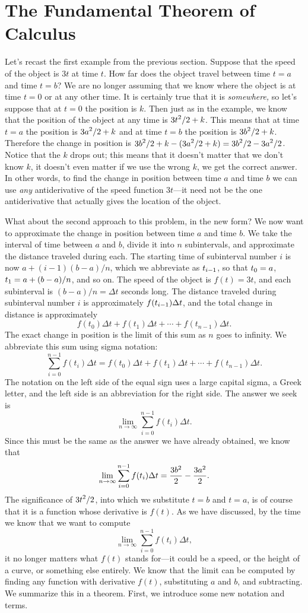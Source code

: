 \section{The Fundamental Theorem of Calculus}{}{}
\nobreak
Let's recast the first example from the previous section. Suppose that
the speed of the object is $3t$ at time $t$. How far does the object
travel between time $t=a$ and time $t=b$? We are no longer assuming
that we know where the object is at time $t=0$ or at any other
time. It is certainly true that it is {\it somewhere,} so let's
suppose that at $t=0$ the position is $k$. Then just as in the
example, we know that the position of the object at any time is 
$\displaystyle 3t^2/2+k$. This means that at time $t=a$ the position is 
$\displaystyle 3a^2/2+k$ and at time $t=b$ the position is $\displaystyle 3b^2/2+k$. Therefore the
change in position is $\displaystyle 3b^2/2+k-(3a^2/2+k)=3b^2/2-3a^2/2$. Notice that
the $k$ drops out; this means that it doesn't matter that we don't
know $k$, it doesn't even matter if we use the wrong $k$, we get the
correct answer. In other words, to find the change in position between
time $a$ and time $b$ we can use {\it any\/} antiderivative of the
speed function $3t$---it need not be the one antiderivative that
actually gives the location of the object.

What about the second approach to this problem, in the new form? We
now want to approximate the change in position between time $a$ and
time $b$. We take the interval of time between $a$ and $b$, divide it
into $n$ subintervals, and approximate the distance traveled during
each. The starting time of subinterval number $i$ is now 
$a+(i-1)(b-a)/n$, which we abbreviate as $\displaystyle t_{i-1}$, so that 
$\displaystyle t_0=a$, $\displaystyle t_1=a+(b-a)/n$, and so on. The speed of the object is
$f(t)=3t$, and each subinterval is $(b-a)/n=\Delta t$ seconds long.
The distance traveled during subinterval number
$i$ is approximately $\displaystyle f(t_{i-1})\Delta t$, and the total change in
distance is approximately
$$
  f(t_0)\Delta t+f(t_1)\Delta t+\cdots+f(t_{n-1})\Delta t.
$$
The exact change in position is the limit of this sum as $n$ goes to
infinity. We abbreviate this sum using {\dfont sigma notation}:
$$
  \sum_{i=0}^{n-1} f(t_i)\Delta t =
f(t_0)\Delta t+f(t_1)\Delta t+\cdots+f(t_{n-1})\Delta t.
$$
The notation on the left side of the equal sign uses a large capital
sigma, a Greek letter, and the left side is an abbreviation for the
right side. The answer we seek is
$$
  \lim_{n\to\infty}\sum_{i=0}^{n-1} f(t_i)\Delta t.
$$
Since this must be the same as the answer we have already obtained, we
know that 
$$
  \lim_{n\to\infty}\sum_{i=0}^{n-1} f(t_i)\Delta t={3b^2\over
  2}-{3a^2\over 2}.
$$
The significance of $\displaystyle 3t^2/2$, into which we substitute $t=b$ and
$t=a$, is of course that it is a function whose derivative is $f(t)$.
As we have discussed, by the time we know that we want to compute
$$
  \lim_{n\to\infty}\sum_{i=0}^{n-1} f(t_i)\Delta t,
$$
it no longer matters what $f(t)$ stands for---it could be a speed, or
the height of a curve, or something else entirely. We know that
the limit can be computed by finding any function with derivative
$f(t)$, substituting $a$ and $b$, and subtracting. We summarize this
in a theorem. First, we introduce some new notation and terms.


